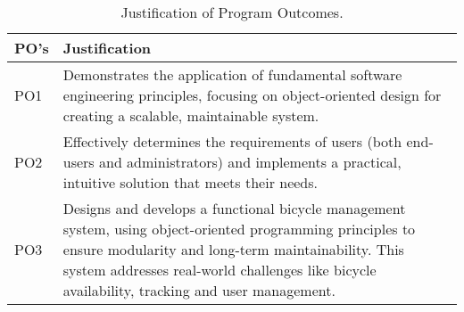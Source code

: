 \begin{center}
    \begin{table}[ht]
    
        \begin{tabular}{|p{}|p{}|}
            \hline
            \textbf{PO's} & \textbf{Justification} \\
            \hline
            PO1 & Demonstrates the application of fundamental software engineering principles, focusing on object-oriented design for creating a scalable, maintainable system. \\
            \hline
            PO2 & Effectively determines the requirements of users (both end-users and administrators) and implements a practical, intuitive solution that meets their needs.\\
            \hline
            PO3 & Designs and develops a functional bicycle management system, using object-oriented programming principles to ensure modularity and long-term maintainability. This system addresses real-world challenges like bicycle availability, tracking and user management.\\
            \hline
        \end{tabular}
        \centering
        \caption{Justification of Program Outcomes.}
        \label{tab:po_justification}
    \end{table}
\end{center}

